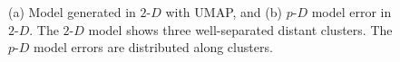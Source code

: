 \documentclass[
  12pt]{article}
\begin{document}
\begin{figure}[H]


\caption{\label{fig-model-pbmc-author}(a) Model generated in
\(2\text{-}D\) with UMAP, and (b) \(p\text{-}D\) model error in
\(2\text{-}D\). The \(2\text{-}D\) model shows three well-separated
distant clusters. The \(p\text{-}D\) model errors are distributed along
clusters.}

\end{figure}%

\begin{figure}[H]

\begin{minipage}{0.33\linewidth}


\subcaption{\label{fig-pbmc1_sc1}}

\end{minipage}%
%
\begin{minipage}{0.33\linewidth}


\end{minipage}
\end{figure}
\end{document}
